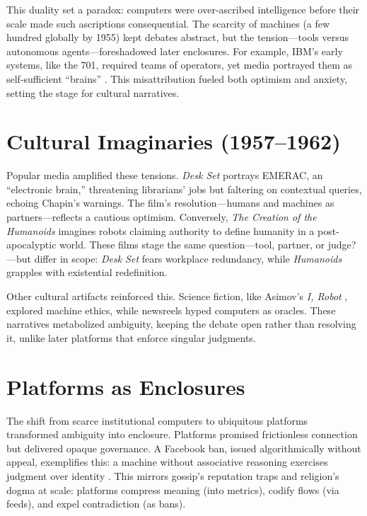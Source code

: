\documentclass[a4paper,12pt]{article}
\begin{document}
This duality set a paradox: computers were over-ascribed intelligence before their scale made such ascriptions consequential. The scarcity of machines (a few hundred globally by 1955) kept debates abstract, but the tension—tools versus autonomous agents—foreshadowed later enclosures. For example, IBM’s early systems, like the 701, required teams of operators, yet media portrayed them as self-sufficient ``brains'' \citep{edwards1996closed}. This misattribution fueled both optimism and anxiety, setting the stage for cultural narratives.

\section{Cultural Imaginaries (1957–1962)}
Popular media amplified these tensions. \emph{Desk Set} \citep{deskset1957} portrays EMERAC, an ``electronic brain,'' threatening librarians’ jobs but faltering on contextual queries, echoing Chapin’s warnings. The film’s resolution—humans and machines as partners—reflects a cautious optimism. Conversely, \emph{The Creation of the Humanoids} \citep{humanoids1962} imagines robots claiming authority to define humanity in a post-apocalyptic world. These films stage the same question—tool, partner, or judge?—but differ in scope: \emph{Desk Set} fears workplace redundancy, while \emph{Humanoids} grapples with existential redefinition. 

Other cultural artifacts reinforced this. Science fiction, like Asimov’s \emph{I, Robot} \citep{asimov1950irobot}, explored machine ethics, while newsreels hyped computers as oracles. These narratives metabolized ambiguity, keeping the debate open rather than resolving it, unlike later platforms that enforce singular judgments.

\section{Platforms as Enclosures}
The shift from scarce institutional computers to ubiquitous platforms transformed ambiguity into enclosure. Platforms promised frictionless connection but delivered opaque governance. A Facebook ban, issued algorithmically without appeal, exemplifies this: a machine without associative reasoning exercises judgment over identity \citep{gillespie2018custodians}. This mirrors gossip’s reputation traps and religion’s dogma at scale: platforms compress meaning (into metrics), codify flows (via feeds), and expel contradiction (as bans). 
\end{document}
